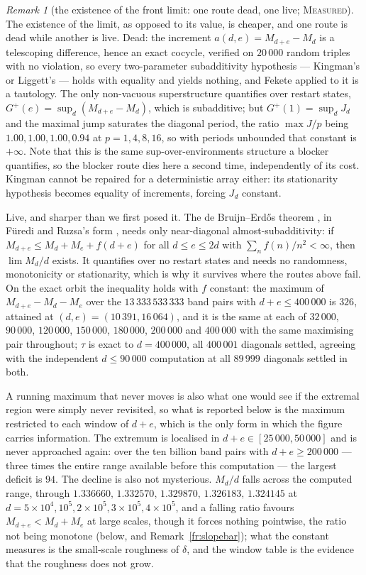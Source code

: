 \documentclass[11pt]{article}
\theoremstyle{definition}
\theoremstyle{remark}
\newtheorem{remark}[theorem]{Remark}
\newcommand{\MEASURED}{\textsc{Measured}}
\begin{document}
\begin{remark}[the existence of the front limit: one route dead, one live; \MEASURED]\label{fr:exists}
The existence of the limit, as opposed to its value, is cheaper, and one route is dead while another is
live. Dead: the increment $a(d,e)=M_{d+e}-M_d$ is a telescoping difference, hence an exact cocycle,
verified on $20\,000$ random triples with no violation, so every two-parameter subadditivity hypothesis
--- Kingman's or Liggett's --- holds with equality and yields nothing, and Fekete applied to it is a
tautology. The only non-vacuous superstructure quantifies over restart states,
$G^{+}(e)=\sup_d(M_{d+e}-M_d)$, which is subadditive; but $G^{+}(1)=\sup_d J_d$ and the maximal jump
saturates the diagonal period, the ratio $\max J/p$ being $1.00,1.00,1.00,0.94$ at $p=1,4,8,16$, so with
periods unbounded that constant is $+\infty$. Note that this is the same sup-over-environments
structure a blocker quantifies, so the blocker route dies here a second time, independently of its
cost. Kingman cannot be repaired for a deterministic array either: its stationarity hypothesis becomes
equality of increments, forcing $J_d$ constant.

Live, and sharper than we first posed it. The de Bruijn--Erd\H{o}s theorem \cite{dBE}, in F\"uredi and
Ruzsa's form \cite{FR}, needs only near-diagonal almost-subadditivity: if
$M_{d+e}\le M_d+M_e+f(d+e)$ for all $d\le e\le 2d$ with $\sum_nf(n)/n^{2}<\infty$, then $\lim M_d/d$
exists. It quantifies over no restart states and needs no randomness, monotonicity or stationarity,
which is why it survives where the routes above fail. On the exact orbit the inequality holds with $f$
constant: the maximum of $M_{d+e}-M_d-M_e$ over the $13\,333\,533\,333$ band pairs with
$d+e\le400\,000$ is $326$, attained at $(d,e)=(10\,391,16\,064)$, and it is the same at each of
$32\,000$, $90\,000$, $120\,000$, $150\,000$, $180\,000$, $200\,000$ and $400\,000$ with the same
maximising pair throughout; $\tau$ is exact to $d=400\,000$, all $400\,001$ diagonals settled, agreeing
with the independent $d\le90\,000$ computation at all $89\,999$ diagonals settled in both.

A running maximum that never moves is also what one would see if the extremal region were simply never
revisited, so what is reported below is the maximum restricted to each window of $d+e$, which is the only
form in which the figure carries information. The extremum is localised in
$d+e\in[25\,000,50\,000]$ and is never approached again: over the ten billion band pairs with
$d+e\ge200\,000$ --- three times the entire range available before this computation --- the largest
deficit is $94$. The decline is also not mysterious. $M_d/d$ falls across the computed range,
through $1.336660,\,1.332570,\,1.329870,\,1.326183,\,1.324145$ at
$d=5\times10^{4},10^{5},2\times10^{5},3\times10^{5},4\times10^{5}$, and a falling ratio favours
$M_{d+e}<M_d+M_e$ at large scales, though it forces nothing pointwise, the ratio not being monotone (below, and
Remark~\ref{fr:slopebar}); what the constant measures is the small-scale
roughness of $\delta$, and the window table is the evidence that the roughness does not grow.


\end{remark}
\end{document}
